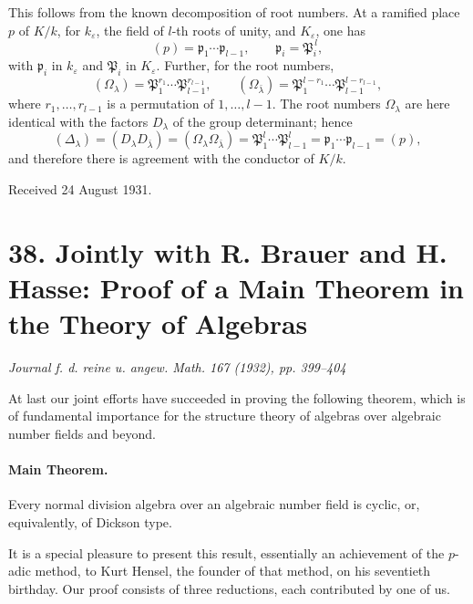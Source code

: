 \documentclass[11pt]{article}
\begin{document}
This follows from the known decomposition of root numbers. At a ramified place \(p\) of \(K/k\), for \(k_\varepsilon\), the field of \(l\)-th roots of unity, and \(K_\varepsilon\), one has
\[
        (p)=\mathfrak p_1\cdots\mathfrak p_{l-1},\qquad
        \mathfrak p_i=\mathfrak P_i^{\,l},
\]
with \(\mathfrak p_i\) in \(k_\varepsilon\) and \(\mathfrak P_i\) in \(K_\varepsilon\). Further, for the root numbers,
\[
        (\Omega_\lambda)=\mathfrak P_1^{r_1}\cdots
        \mathfrak P_{l-1}^{r_{l-1}},
        \qquad
        (\Omega_{\bar\lambda})=
        \mathfrak P_1^{l-r_1}\cdots \mathfrak P_{l-1}^{l-r_{l-1}},
\]
where \(r_1,\ldots,r_{l-1}\) is a permutation of \(1,\ldots,l-1\). The root numbers \(\Omega_\lambda\) are here identical with the factors \(D_\lambda\) of the group determinant; hence
\[
        (\Delta_\lambda)=(D_\lambda D_{\bar\lambda})
        =(\Omega_\lambda\Omega_{\bar\lambda})
        =\mathfrak P_1^l\cdots\mathfrak P_{l-1}^l
        =\mathfrak p_1\cdots\mathfrak p_{l-1}
        =(p),
\]
and therefore there is agreement with the conductor of \(K/k\).

\begin{center}
Received 24 August 1931.
\end{center}

\section*{38. Jointly with R. Brauer and H. Hasse: Proof of a Main Theorem in the Theory of Algebras}

\begin{center}
\emph{Journal f. d. reine u. angew. Math. 167 (1932), pp. 399--404}
\end{center}

At last our joint efforts have succeeded in proving the following theorem, which is of fundamental importance for the structure theory of algebras over algebraic number fields and beyond.

\paragraph{Main Theorem.}
Every normal division algebra over an algebraic number field is cyclic, or, equivalently, of Dickson type.

It is a special pleasure to present this result, essentially an achievement of the \(p\)-adic method, to Kurt Hensel, the founder of that method, on his seventieth birthday. Our proof consists of three reductions, each contributed by one of us.
\end{document}

